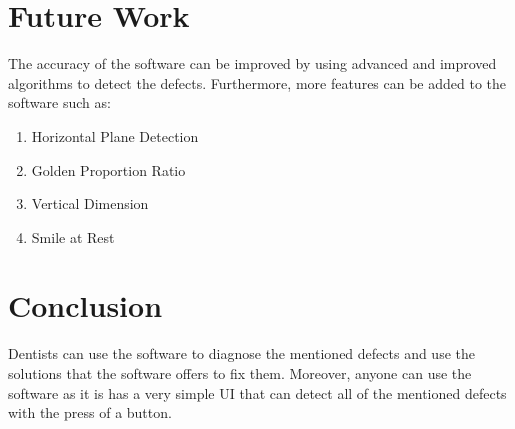 \documentclass[conference,twocolumn]{IEEEtran}
\begin{document}
\section{Future Work}
The accuracy of the software can be improved by using advanced and improved algorithms to detect the defects. Furthermore, more features can be added to the software such as:
\begin{enumerate}
    \item Horizontal Plane Detection
    \item Golden Proportion Ratio
    \item Vertical Dimension 
    \item Smile at Rest
\end{enumerate}

\section{Conclusion}
Dentists can use the software to diagnose the mentioned defects and use the solutions that the software offers to fix them. Moreover, anyone can use the software as it is has a very simple UI that can detect all of the mentioned defects with the press of a button.
\end{document}
